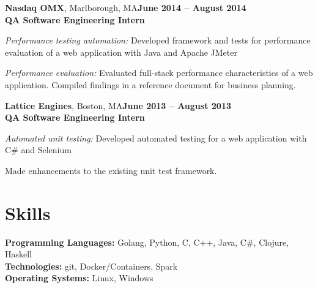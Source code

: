 \documentclass[margin,line]{resume}
\begin{document}
\begin{resume}
\textbf{Nasdaq OMX}, Marlborough, MA\hfill\textbf{June 2014 -- August 2014}\\
\textbf{QA Software Engineering Intern}\hfill 
\vspace{-3mm}\\\vspace{-1mm}
\begin{list2}
	\item \filbreak\textit{Performance testing automation:} Developed framework
    and tests for performance evaluation of a web application with Java and Apache JMeter
	\item \filbreak\textit{Performance evaluation:} Evaluated full-stack performance characteristics of a web application. Compiled findings in a reference document for business planning.
\end{list2}

\textbf{Lattice Engines}, Boston, MA\hfill\textbf{June 2013 -- August 2013}\\
\textbf{QA Software Engineering Intern}\hfill 
\vspace{-3mm}\\\vspace{-1mm}
\begin{list2}
	\item \filbreak\textit{Automated unit testing:} Developed automated testing
    for a web application with C\# and Selenium
    \item Made enhancements to the existing unit test framework.
\end{list2}



\filbreak
\section{\mysidestyle Skills}
\textbf{Programming Languages:} Golang, Python, C, C++, Java, C\#, Clojure,
Haskell\\
\textbf{Technologies:} git, Docker/Containers, Spark\\
\textbf{Operating Systems:} Linux, Windows



\end{resume}
\end{document}
